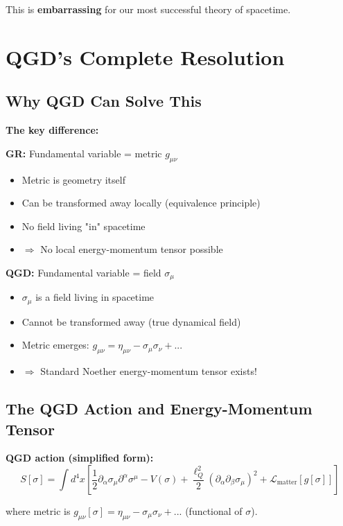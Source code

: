 \documentclass[11pt,a4paper]{article}
\theoremstyle{definition}
\theoremstyle{remark}
\begin{document}
	This is \textbf{embarrassing} for our most successful theory of spacetime.
	
	\section{QGD's Complete Resolution}
	
	\subsection{Why QGD Can Solve This}
	
		\textbf{The key difference:}
		
		\textbf{GR:} Fundamental variable = metric $g_{\mu\nu}$
		\begin{itemize}
			\item Metric is geometry itself
			\item Can be transformed away locally (equivalence principle)
			\item No field living "in" spacetime
			\item $\Rightarrow$ No local energy-momentum tensor possible
		\end{itemize}
		
		\textbf{QGD:} Fundamental variable = field $\sigma_\mu$
		\begin{itemize}
			\item $\sigma_\mu$ is a field living in spacetime
			\item Cannot be transformed away (true dynamical field)
			\item Metric emerges: $g_{\mu\nu} = \eta_{\mu\nu} - \sigma_\mu\sigma_\nu + ...$
			\item $\Rightarrow$ Standard Noether energy-momentum tensor exists!
		\end{itemize}
	
	\subsection{The QGD Action and Energy-Momentum Tensor}
	
	\textbf{QGD action (simplified form):}
	\begin{equation}
		S[\sigma] = \int d^4x\left[\frac{1}{2}\partial_\alpha\sigma_\mu\partial^\alpha\sigma^\mu - V(\sigma) + \frac{\ell_Q^2}{2}(\partial_\alpha\partial_\beta\sigma_\mu)^2 + \mathcal{L}_{\text{matter}}[g[\sigma]]\right]
	\end{equation}
	
	where metric is $g_{\mu\nu}[\sigma] = \eta_{\mu\nu} - \sigma_\mu\sigma_\nu + ...$ (functional of $\sigma$).
	
\end{document}
